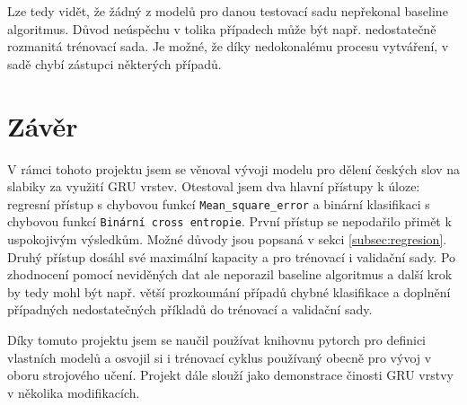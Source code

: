 \documentclass[a4paper]{article}
\theoremstyle{definition}
\begin{document}
Lze tedy vidět, že žádný z modelů pro danou testovací sadu nepřekonal baseline algoritmus.
Důvod neúspěchu v tolika případech může být např. nedostatečně rozmanitá trénovací sada. Je možné, že díky nedokonalému procesu vytváření, v sadě chybí zástupci některých případů.

\section{Závěr}
V rámci tohoto projektu jsem se věnoval vývoji modelu pro dělení českých slov na slabiky za využití GRU vrstev. Otestoval jsem dva hlavní přístupy k úloze: regresní přístup s chybovou funkcí \texttt{Mean\_square\_error} a binární klasifikaci s chybovou funkcí \texttt{Binární cross entropie}. První přístup se nepodařilo přimět k uspokojivým výsledkům. Možné důvody jsou popsaná v sekci \ref{subsec:regresion}. Druhý přístup dosáhl své maximální kapacity a pro trénovací i validační sady. Po zhodnocení pomocí neviděných dat ale neporazil baseline algoritmus a další krok by tedy mohl být např. větší prozkoumání případů chybné klasifikace a doplnění případných nedostatečných příkladů do trénovací a validační sady.

Díky tomuto projektu jsem se naučil používat knihovnu pytorch pro definici vlastních modelů a osvojil si i trénovací cyklus používaný obecně pro vývoj v oboru strojového učení. Projekt dále slouží jako demonstrace činosti GRU vrstvy v několika modifikacích.
\end{document}
